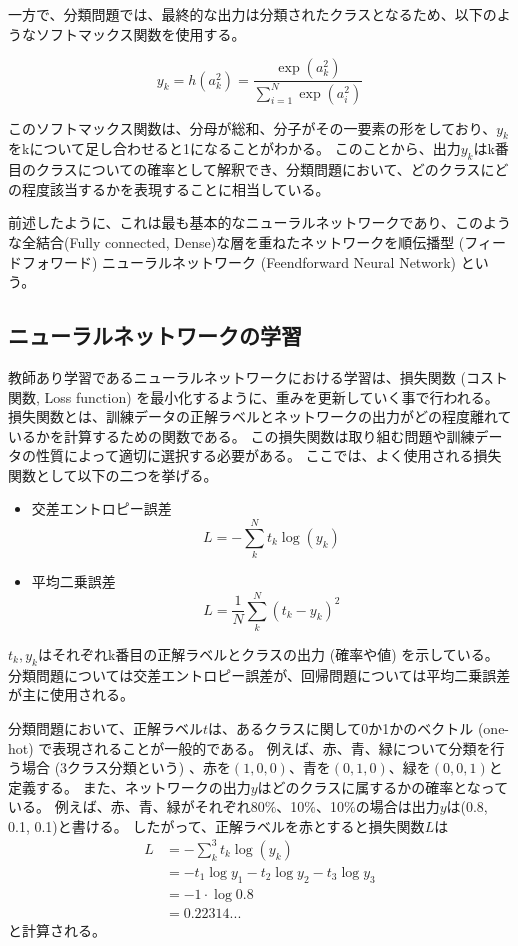 一方で、分類問題では、最終的な出力は分類されたクラスとなるため、以下のようなソフトマックス関数を使用する。

\begin{equation}
 y_k = h(a^2_k) = \frac{\exp{(a^2_k)}}{\sum^N_{i=1}\exp{(a^2_i)}}
\end{equation}

このソフトマックス関数は、分母が総和、分子がその一要素の形をしており、$y_k$をkについて足し合わせると1になることがわかる。
このことから、出力$y_k$はk番目のクラスについての確率として解釈でき、分類問題において、どのクラスにどの程度該当するかを表現することに相当している。

前述したように、これは最も基本的なニューラルネットワークであり、このような全結合(Fully connected, Dense)な層を重ねたネットワークを順伝播型 (フィードフォワード) ニューラルネットワーク (Feendforward Neural Network) という。

\subsection{ニューラルネットワークの学習} \label{DL:NN:TrainingofNN}

教師あり学習であるニューラルネットワークにおける学習は、損失関数 (コスト関数, Loss function) を最小化するように、重みを更新していく事で行われる。
損失関数とは、訓練データの正解ラベルとネットワークの出力がどの程度離れているかを計算するための関数である。
この損失関数は取り組む問題や訓練データの性質によって適切に選択する必要がある。
ここでは、よく使用される損失関数として以下の二つを挙げる。
\begin{itemize}
  \item 交差エントロピー誤差
\begin{equation}
 L = - \sum^N_k t_k \log{(y_k)}
\end{equation}
  \item 平均二乗誤差
\begin{equation}
 L = \frac{1}{N} \sum^N_k(t_k - y_k)^2
\end{equation}
\end{itemize}
$t_k, y_k$はそれぞれk番目の正解ラベルとクラスの出力 (確率や値) を示している。
分類問題については交差エントロピー誤差が、回帰問題については平均二乗誤差が主に使用される。

分類問題において、正解ラベル$t$は、あるクラスに関して0か1かのベクトル (one-hot) で表現されることが一般的である。
例えば、赤、青、緑について分類を行う場合 (3クラス分類という) 、赤を$(1, 0, 0)$、青を$(0, 1, 0)$、緑を$(0, 0, 1)$と定義する。
また、ネットワークの出力$y$はどのクラスに属するかの確率となっている。
例えば、赤、青、緑がそれぞれ80\%、10\%、10\%の場合は出力$y$は(0.8, 0.1, 0.1)と書ける。
したがって、正解ラベルを赤とすると損失関数$L$は
\begin{equation}
 \begin{split}
  L &= - \sum^3_k t_k \log{(y_k)} \\
    &= - t_1 \log{y_1} - t_2 \log{y_2} - t_3 \log{y_3} \\
    &= - 1 \cdot \log{0.8}\\
    &= 0.22314...
 \end{split}
\end{equation}
と計算される。

